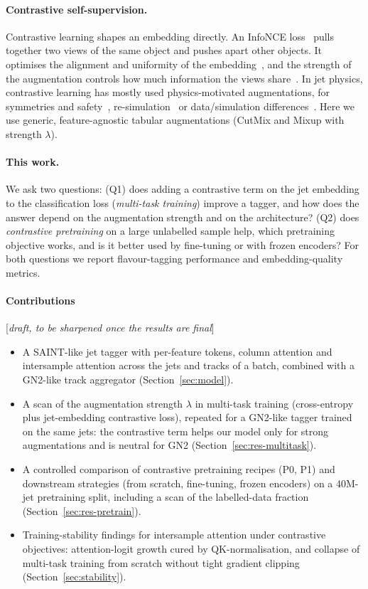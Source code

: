 \documentclass[11pt,a4paper]{article}
\newcommand{\note}[1]{\textcolor{blue!70!black}{[\emph{#1}]}}
\begin{document}
\paragraph{Contrastive self-supervision.}
Contrastive learning shapes an embedding directly. An InfoNCE loss~\citep{oord2018representation,Chen2020SimCLR}
pulls together two views of the same object and pushes apart other objects. It optimises
the alignment and uniformity of the embedding~\citep{Wang2020AlignmentUniformity}, and the
strength of the augmentation controls how much information the views share~\citep{tian2020makes}.
In jet physics, contrastive learning has mostly used physics-motivated augmentations,
for symmetries and safety~\citep{Dillon2022JetCLR}, re-simulation~\citep{Harris2025Resim}
or data/simulation differences~\citep{Sheldon2025MACK}. Here we use generic,
feature-agnostic tabular augmentations (CutMix and Mixup with strength $\lambda$).

\paragraph{This work.}
We ask two questions:
(Q1) does adding a contrastive term on the jet embedding to the classification loss
(\emph{multi-task training}) improve a tagger, and how does the answer depend on the
augmentation strength and on the architecture?
(Q2) does \emph{contrastive pretraining} on a large unlabelled sample help, which
pretraining objective works, and is it better used by fine-tuning or with frozen encoders?
For both questions we report flavour-tagging performance and embedding-quality metrics.

\paragraph{Contributions} \note{draft, to be sharpened once the results are final}
\begin{itemize}
  \item A SAINT-like jet tagger with per-feature tokens, column attention and intersample
        attention across the jets and tracks of a batch, combined with a GN2-like track
        aggregator (Section~\ref{sec:model}).
  \item A scan of the augmentation strength $\lambda$ in multi-task training (cross-entropy
        plus jet-embedding contrastive loss), repeated for a GN2-like tagger trained on the
        same jets: the contrastive term helps our model only for strong augmentations and
        is neutral for GN2 (Section~\ref{sec:res-multitask}).
  \item A controlled comparison of contrastive pretraining recipes (P0, P1) and downstream
        strategies (from scratch, fine-tuning, frozen encoders) on a 40M-jet pretraining
        split, including a scan of the labelled-data fraction (Section~\ref{sec:res-pretrain}).
  \item Training-stability findings for intersample attention under contrastive objectives:
        attention-logit growth cured by QK-normalisation, and collapse of multi-task training
        from scratch without tight gradient clipping (Section~\ref{sec:stability}).
\end{itemize}
\end{document}
